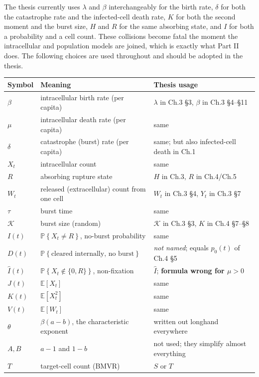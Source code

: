 \documentclass[11pt]{article}
\newcommand{\E}{\mathbb{E}}
\newcommand{\Prob}[1]{\mathbb{P}\!\left\{#1\right\}}
\newcommand{\xt}{X_t}
\newcommand{\wt}{W_t}
\newcommand{\Ihat}{\widehat{I}}
\newcommand{\Kb}{\mathcal{K}}
\newcommand{\Aa}{A}
\newcommand{\Bb}{B}
\theoremstyle{plain}
\theoremstyle{definition}
\theoremstyle{remark}
\begin{document}
The thesis currently uses $\lambda$ and $\beta$ interchangeably for the birth rate,
$\delta$ for both the catastrophe rate and the infected-cell death rate, $K$ for both the
second moment and the burst size, $H$ and $R$ for the same absorbing state, and $I$ for both
a probability and a cell count. These collisions become fatal the moment the intracellular
and population models are joined, which is exactly what Part II does. The following
choices are used throughout and should be adopted in the thesis.

\begin{center}
\begin{tabular}{@{}llp{}@{}}
\toprule
Symbol & Meaning & Thesis usage \\
\midrule
$\beta$ & intracellular birth rate (per capita) & $\lambda$ in Ch.3 \S3, $\beta$ in Ch.3 \S4--\S11 \\
$\mu$ & intracellular death rate (per capita) & same \\
$\delta$ & catastrophe (burst) rate (per capita) & same; but also infected-cell death in Ch.1 \\
$\xt$ & intracellular count & same \\
$R$ & absorbing rupture state & $H$ in Ch.3, $R$ in Ch.4/Ch.5 \\
$\wt$ & released (extracellular) count from one cell & $\wt$ in Ch.3 \S4, $Y_t$ in Ch.3 \S7 \\
$\tau$ & burst time & same \\
$\Kb$ & burst size (random) & $\mathcal K$ in Ch.3 \S3, $K$ in Ch.4 \S7--\S8 \\
$I(t)$ & $\Prob{\xt\neq R}$, no-burst probability & same \\
$D(t)$ & $\Prob{\text{cleared internally, no burst}}$ & \emph{not named}; equals $p_0(t)$ of Ch.4 \S5 \\
$\Ihat(t)$ & $\Prob{\xt\notin\{0,R\}}$, non-fixation & $\hat I$; \textbf{formula wrong for $\mu>0$} \\
$J(t)$ & $\E[\xt]$ & same \\
$K(t)$ & $\E[\xt^2]$ & same \\
$V(t)$ & $\E[\wt]$ & same \\
$\theta$ & $\beta(a-b)$, the characteristic exponent & written out longhand everywhere \\
$\Aa,\Bb$ & $a-1$ and $1-b$ & not used; they simplify almost everything \\
\midrule
$T$ & target-cell count (BMVR) & $S$ or $T$ \\

\end{tabular}
\end{center}
\end{document}
